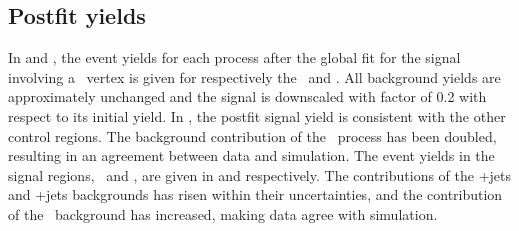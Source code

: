 \subsection{Postfit yields}
\label{sec:postfityields}
In  and , the  event yields for each process after the global fit for the signal involving a \Zut\ vertex is given for respectively the \STCR\ and \TTCR. All background yields are approximately unchanged and the signal is downscaled with factor of 0.2 with respect to its initial yield. In , the postfit signal yield is consistent with the other control regions. The background contribution of the \NPL\ process has been doubled, resulting in an agreement between data and simulation. The event yields in the signal regions, \STSR\ and \TTSR, are given in  and  respectively. The contributions of the \WZ+jets and \ttZ+jets backgrounds has risen within their uncertainties, and the contribution of the \NPL\ background has increased, making data agree with simulation. 

